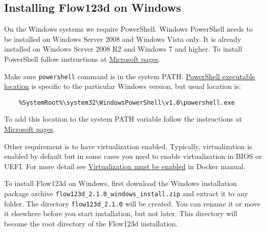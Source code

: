 \subsection{Installing Flow123d on Windows}
On the Windows systems we require PowerShell. Windows PowerShell needs to be installed on Windows Server 2008 and Windows Vista only.
It is already installed on Windows Server 2008 R2 and Windows 7 and higher. To install PowerShell follow instructions at
\href{https://msdn.microsoft.com/en-us/powershell/scripting/setup/installing-windows-powershell}{Microsoft pages}.

Make sure \verb'powershell' command is in the system PATH. 
\href{http://www.powershelladmin.com/wiki/PowerShell_Executables_File_System_Locations}{PowerShell executable location}
 is specific to the particular Windows version, but usual location is:
 \begin{verbatim}
    %SystemRoot%\system32\WindowsPowerShell\v1.0\powershell.exe  
 \end{verbatim}
 To add this location to the system PATH variable follow the instructions at
 \href{https://msdn.microsoft.com/en-us/library/office/ee537574(v=office.14).aspx}{Microsoft pages}.

Other requirement is to have virtualization enabled. Typically, virtualization is enabled by default but in some
cases you need to enable virtualization in BIOS or UEFI. For more detail see 
\href{https://docs.docker.com/docker-for-windows/troubleshoot/#virtualization-must-be-enabled}{Virtualization must be enabled} in Docker manual.

To install Flow123d on Windows, first download the Windows installation package archive \verb'flow123d_2.1.0_windows_install.zip' and extract it to any folder.
The directory \verb'flow123d_2.1.0' will be created. You can rename it or move it elsewhere before you start installation, but not later. 
This directory will become the root directory of the Flow123d installation. 

